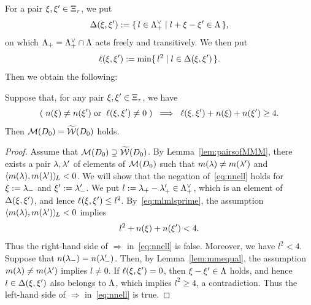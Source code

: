 \documentclass{amsart} %
\begin{document}
%
%
For a pair $\xi, \xi^{\prime}\in \Xi_{\tau}$,
we put
%
\begin{equation}\label{eq:diffellset}
\Delta(\xi, \xi^{\prime}):=
\{\,{l\in \Lambda_{+}^{\vee}}\mid {l+\xi-\xi^{\prime}\in \Lambda} \,\},
\end{equation}
%
on which $\Lambda_{+}= \Lambda_{+}^{\vee}\cap\Lambda$ acts freely and transitively.
We then put 
%
\begin{equation}\label{eq:diffell}
\ell(\xi, \xi^{\prime}):=\min\{\,{l^2}\mid {l\in \Delta(\xi, \xi^{\prime})} \,\}.
\end{equation}
%
Then we obtain the following:
%
\begin{lemma}\label{lem:MMMtilwalls}
Suppose that, for any pair $\xi, \xi^{\prime}\in \Xi_{\tau}$,
we have
%
\begin{equation}\label{eq:nnell}
(\;n(\xi)\ne n(\xi^{\prime}) \; \textrm{\rm or}\; \;\ell(\xi, \xi^{\prime})\ne 0 \;)\;\;\Longrightarrow\;\; \ell(\xi, \xi^{\prime})+n(\xi)+n(\xi^{\prime})\ge 4.
\end{equation}
%
Then  $\mathord{\mathcal{M}}(D_0)=\widetilde{\mathord{\mathcal{W}}} (D_0)$ holds.
\end{lemma}
%
\begin{proof}
Assume that $\mathord{\mathcal{M}}(D_0)\supsetneq\widetilde{\mathord{\mathcal{W}}} (D_0)$.
By Lemma~\ref{lem:pairsofMMM},
there exists a pair $\lambda, \lambda^{\prime}$ of elements of $ \mathord{\mathcal{M}}(D_0)$
such that $m(\lambda)\ne m(\lambda^{\prime})$ and $ \langle m(\lambda), m(\lambda^{\prime}) \rangle_{\hskip -1pt L} <0$.
We will show that the negation of~\eqref{eq:nnell} holds for
$\xi:={\lambda}_{-}$ and $\xi^{\prime}:={\lambda}_{-}^{\prime}$.
We put $l:={\lambda}_{+}-{\lambda}_{+}^{\prime}\in \Lambda_{+}^{\vee}$,
which is an element of $\Delta(\xi, \xi^{\prime})$,
and lence $\ell(\xi, \xi^{\prime})\le l^2$.
By~\eqref{eq:mlmlsprime},
the assumption  $ \langle m(\lambda), m(\lambda^{\prime}) \rangle_{\hskip -1pt L} <0$ implies 
%
\begin{equation*}\label{eq:lnn}
l^2+n(\xi)+n(\xi^{\prime})<4.
\end{equation*}
%
Thus the right-hand side of $\Longrightarrow$ in~\eqref{eq:nnell} is false.
Moreover, we have $l^2<4$.
Suppose that $n({\lambda}_{-})=n({\lambda}_{-}^{\prime})$.
Then, by Lemma~\ref{lem:mmequal},
the assumption $m(\lambda)\ne m(\lambda^{\prime})$ implies   $l\ne 0$.
If $\ell(\xi, \xi^{\prime})= 0$, then 
$\xi-\xi^{\prime}\in \Lambda$ holds,  and hence 
$l\in \Delta(\xi, \xi^{\prime})$ also belongs to $\Lambda$,
which implies $l^2\ge 4$, a contradiction.
Thus the left-hand side of $\Longrightarrow$ in~\eqref{eq:nnell} is true.
\end{proof}
\end{document}
